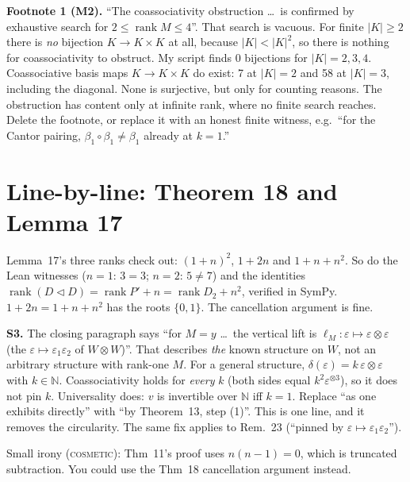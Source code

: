 \documentclass[11pt]{article}
\newcommand{\tri}{\mathbin{\triangleleft}}
\newcommand{\N}{\mathbb{N}}
\newcommand{\iss}[1]{\textsc{#1}}
\begin{document}
\textbf{Footnote 1 (M2).} ``The coassociativity obstruction \dots\ is confirmed by exhaustive search
for $2\le\operatorname{rank}M\le4$''. That search is vacuous. For finite $|K|\ge2$ there is
\emph{no} bijection $K\to K\times K$ at all, because $|K|<|K|^2$, so there is nothing for
coassociativity to obstruct. My script finds $0$ bijections for $|K|=2,3,4$. Coassociative basis
maps $K\to K\times K$ do exist: 7 at $|K|=2$ and 58 at $|K|=3$, including the diagonal. None is
surjective, but only for counting reasons. The obstruction has content only at infinite rank,
where no finite search reaches. Delete the footnote, or replace it with an honest finite witness,
e.g.\ ``for the Cantor pairing, $\beta_1\circ\beta_1\neq\beta_1$ already at $k=1$.''

\section{Line-by-line: Theorem 18 and Lemma 17}
Lemma~17's three ranks check out: $(1+n)^2$, $1+2n$ and $1+n+n^2$. So do the Lean witnesses
($n=1$: $3=3$; $n=2$: $5\neq7$) and the identities
$\operatorname{rank}(D\tri D)=\operatorname{rank}P'+n=\operatorname{rank}D_2+n^2$, verified in
SymPy. $1+2n=1+n+n^2$ has the roots $\{0,1\}$. The cancellation argument is fine.

\textbf{S3.} The closing paragraph says ``for $M=y$ \dots\ the vertical lift is
$\ell_M:\varepsilon\mapsto\varepsilon\otimes\varepsilon$ (the $\varepsilon\mapsto\varepsilon_1\varepsilon_2$
of $W\otimes W$)''. That describes \emph{the} known structure on $W$, not an arbitrary structure
with rank-one $M$. For a general structure, $\delta(\varepsilon)=k\,\varepsilon\otimes\varepsilon$
with $k\in\N$. Coassociativity holds for \emph{every} $k$ (both sides equal
$k^2\varepsilon^{\otimes3}$), so it does not pin $k$. Universality does: $v$ is invertible over
$\N$ iff $k=1$. Replace ``as one exhibits directly'' with ``by Theorem~13, step (1)''. This is one
line, and it removes the circularity. The same fix applies to Rem.~23 (``pinned by
$\varepsilon\mapsto\varepsilon_1\varepsilon_2$'').

Small irony (\iss{cosmetic}): Thm~11's proof uses $n(n-1)=0$, which is truncated subtraction. You
could use the Thm~18 cancellation argument instead.
\end{document}
